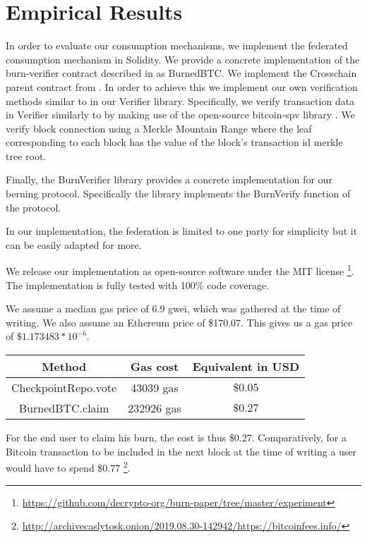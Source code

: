 \section{Empirical Results}

\newcommand{\rref}[1]{}

In order to evaluate our consumption mechanisms, we implement the federated consumption mechanism in Solidity. We provide a concrete implementation of the \textsf{burn-verifier} contract described in \rref{alg.burn-verifier} as \textsf{BurnedBTC}. We implement the \textsf{Crosschain} parent contract from \cite{pow-sidechains}. In order to achieve this we implement our own verification methods similar to \rref{alg.verify-event-federation} in our \textsf{Verifier} library. Specifically, we verify transaction data in \textsf{Verifier} similarly to \rref{alg.verify-tx} by making use of the open-source bitcoin-spv library \cite{bitcoin-spv-library}. We verify block connection using a Merkle Mountain Range where the leaf corresponding to each block has the value of the block's transaction id merkle tree root.

Finally, the \textsf{BurnVerifier} library provides a concrete implementation for our berning protocol. Specifically the library implements the \textsf{BurnVerify} function of the protocol.

In our implementation, the federation is limited to one party for simplicity but it can be easily adapted for more.

We release our implementation as open-source software under the MIT license
\footnote{\url{https://github.com/decrypto-org/burn-paper/tree/master/experiment}}.
The implementation is fully tested with 100\% code coverage.

We assume a median gas price of 6.9 gwei, which was gathered at the time of writing. We also assume an Ethereum price of \$170.07. This gives us a gas price of $\$1.173483 * 10^{-6}$.

\begin{center}
    \begin{tabular}{ |c|c|c| } 
     \hline
     Method & Gas cost & Equivalent in USD \\
     \hline
     \textsf{CheckpointRepo.vote} & 43039 gas & $\$0.05$ \\
     \textsf{BurnedBTC.claim} & 232926 gas & $\$0.27$ \\
     \hline
    \end{tabular}
\end{center}

For the end user to claim his burn, the cost is thus \$0.27. Comparatively, for a Bitcoin transaction to be included in the next block at the time of writing a user would have to spend \$0.77
\footnote{\url{http://archivecaslytosk.onion/2019.08.30-142942/https://bitcoinfees.info/}}.